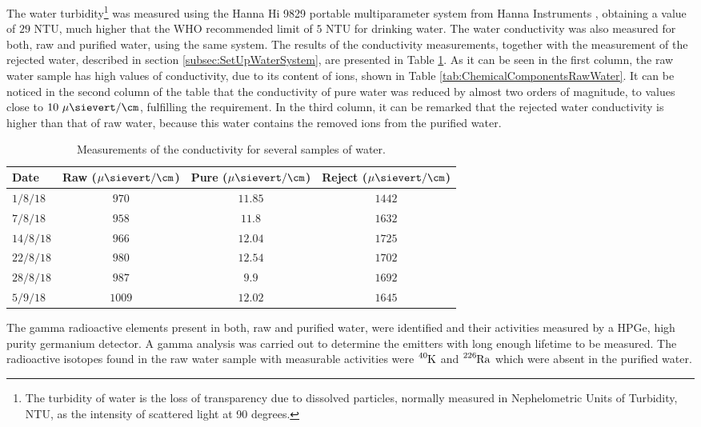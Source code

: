 The water turbidity\footnote{The turbidity of water is the loss of transparency due to dissolved particles, normally measured in Nephelometric Units of Turbidity, NTU, as the intensity of scattered light at 90 degrees.} was measured using the Hanna Hi 9829 portable multiparameter system from Hanna Instruments \cite{TurbiditySystem}, obtaining a value of $29$ NTU, much higher that the WHO recommended limit of $5$ NTU for drinking water. The water conductivity was also measured for both, raw and purified water, using the same system. The results of the conductivity measurements, together with the measurement of the rejected water, described in section \ref{subsec:SetUpWaterSystem}, are presented in Table \ref{tab:ConductivityValues}. As it can be seen in the first column, the raw water sample has high values of conductivity, due to its content of ions, shown in Table \ref{tab:ChemicalComponentsRawWater}. It can be noticed in the second column of the table that the conductivity of pure water was reduced by almost two orders of magnitude, to values close to $10~\mu\sievert/\cm$, fulfilling the requirement. In the third column, it can be remarked that the rejected water conductivity is higher than that of raw water, because this water contains the removed ions from the purified water.


\begin{table}[htbp]
\centering{}%
\begin{tabular}{lccc}
\toprule 
Date & Raw ($\mu\sievert/\cm$) & Pure ($\mu\sievert/\cm$) & Reject ($\mu\sievert/\cm$) \tabularnewline
\midrule
\midrule 
$1/8/18$ & $970$ & $11.85$ & $1442$ \tabularnewline
$7/8/18$ & $958$ & $11.8$ & $1632$ \tabularnewline
$14/8/18$ & $966$ & $12.04$ & $1725$ \tabularnewline
$22/8/18$ & $980$ & $12.54$ & $1702$ \tabularnewline
$28/8/18$ & $987$ & $9.9$ & $1692$ \tabularnewline
$5/9/18$ & $1009$ & $12.02$ & $1645$ \tabularnewline
\bottomrule
\end{tabular}
\caption{Measurements of the conductivity for several samples of water.}
\label{tab:ConductivityValues}
\end{table}

The gamma radioactive elements present in both, raw and purified water, were identified and their activities measured by a HPGe, high purity germanium detector. A gamma analysis was carried out to determine the emitters with long enough lifetime to be measured. The radioactive isotopes found in the raw water sample with measurable activities were $\ce{^{40}K}$ and $\ce{^{226}Ra}$ which were absent in the purified water.

